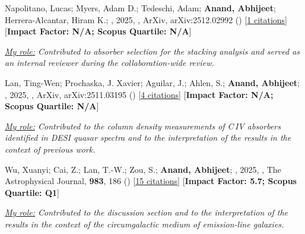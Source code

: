 \item[{\color{numcolor}\scriptsize7}] Napolitano, Lucas; Myers, Adam D.; Tedeschi, Adam; \textbf{Anand, Abhijeet}; Herrera-Alcantar, Hiram K.; \etal, 2025, , ArXiv, arXiv:2512.02992 () [\href{https://ui.adsabs.harvard.edu/abs/2025arXiv251202992N}{1 citations}] [\textbf{Impact Factor: N/A; Scopus Quartile: N/A}]

\vspace{1mm}
\item\textit{\underline{My role:} Contributed to absorber selection for the stacking analysis and served as an internal reviewer during the collaboration-wide review.}
\vspace{1mm}

\item[{\color{numcolor}\scriptsize6}] Lan, Ting-Wen; Prochaska, J. Xavier; Aguilar, J.; Ahlen, S.; \textbf{Anand, Abhijeet}; \etal, 2025, , ArXiv, arXiv:2511.03195 () [\href{https://ui.adsabs.harvard.edu/abs/2025arXiv251103195L}{4 citations}] [\textbf{Impact Factor: N/A; Scopus Quartile: N/A}]

\vspace{1mm}
\item\textit{\underline{My role:} Contributed to the column density measurements of C\,IV absorbers identified in DESI quasar spectra and to the interpretation of the results in the context of previous work.}
\vspace{1mm}

\item[{\color{numcolor}\scriptsize5}] Wu, Xuanyi; Cai, Z.; Lan, T.-W.; Zou, S.; \textbf{Anand, Abhijeet}; \etal, 2025, , The Astrophysical Journal, \textbf{983}, 186 () [\href{https://ui.adsabs.harvard.edu/abs/2025ApJ...983..186W}{15 citations}] [\textbf{Impact Factor: 5.7; Scopus Quartile: Q1}]

\vspace{1mm}
\item\textit{\underline{My role:} Contributed to the discussion section and to the interpretation of the results in the context of the circumgalactic medium of emission-line galaxies.}
\vspace{1mm}


